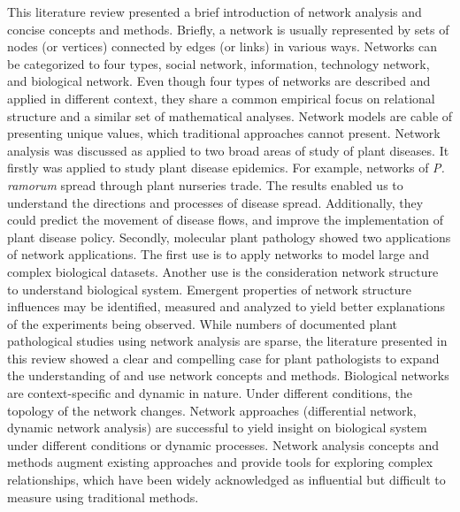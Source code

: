 This literature review presented a brief introduction of network analysis and concise concepts and methods. Briefly, a network is usually represented by sets of nodes (or vertices) connected by edges (or links) in various ways. Networks can be categorized to four types, social network, information, technology network, and biological network. Even though four types of networks are described and applied in different context, they share a common empirical focus on relational structure and a similar set of mathematical analyses. Network models are cable of presenting unique values, which traditional approaches cannot present. Network analysis was discussed as applied to two broad areas of study of plant diseases. It firstly was applied to study plant disease epidemics. For example, networks of \textit{P. ramorum} spread through plant nurseries trade. The results enabled us to understand the directions and processes of disease spread. Additionally, they could predict the movement of disease flows, and improve the implementation of plant disease policy. Secondly, molecular plant pathology showed two applications of network applications. The first use is to apply networks to model large and complex biological datasets. Another use is the consideration network structure to understand biological system. Emergent properties of network structure influences may be identified, measured and analyzed to yield better explanations of the experiments being observed. While numbers of documented plant pathological studies using network analysis are sparse, the literature presented in this review showed a clear and compelling case for plant pathologists to expand the understanding of and use network concepts and methods. 
Biological networks are context-specific and dynamic in nature. Under different conditions, the topology of the network changes. Network approaches (differential network, dynamic network analysis) are successful to yield insight on biological system under different conditions or dynamic processes. Network analysis concepts and methods augment existing approaches and provide tools for exploring complex relationships, which have been widely acknowledged as influential but difficult to measure using traditional methods. 




